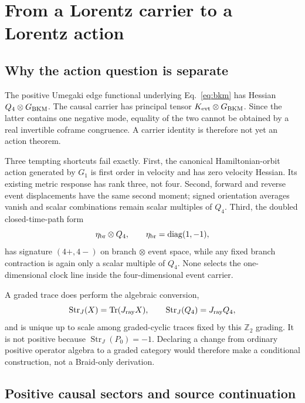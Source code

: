 \documentclass[11pt]{article}
\theoremstyle{definition}
\theoremstyle{remark}
\newcommand{\Tr}{\operatorname{Tr}}
\begin{document}
\section{From a Lorentz carrier to a Lorentz action}

\subsection{Why the action question is separate}

The positive Umegaki edge functional underlying Eq.~\eqref{eq:bkm} has Hessian $Q_4\otimes G_{\rm BKM}$. The causal carrier has principal tensor $K_{\rm evt}\otimes G_{\rm BKM}$. Since the latter contains one negative mode, equality of the two cannot be obtained by a real invertible coframe congruence. A carrier identity is therefore not yet an action theorem.

Three tempting shortcuts fail exactly. First, the canonical Hamiltonian-orbit action generated by $G_1$ is first order in velocity and has zero velocity Hessian. Its existing metric response has rank three, not four. Second, forward and reverse event displacements have the same second moment; signed orientation averages vanish and scalar combinations remain scalar multiples of $Q_4$. Third, the doubled closed-time-path form
\begin{equation}
 \eta_{\rm br}\otimes Q_4,
 \qquad \eta_{\rm br}=\operatorname{diag}(1,-1),
\end{equation}
has signature $(4+,4-)$ on branch $\otimes$ event space, while any fixed branch contraction is again only a scalar multiple of $Q_4$. None selects the one-dimensional clock line inside the four-dimensional event carrier.

A graded trace does perform the algebraic conversion,
\begin{equation}
 \operatorname{Str}_{J}(X)=\Tr(J_{\rm ray}X),
 \qquad \operatorname{Str}_{J}(Q_4)=J_{\rm ray}Q_4,
\end{equation}
and is unique up to scale among graded-cyclic traces fixed by this $\mathbb Z_2$ grading. It is not positive because $\operatorname{Str}_{J}(P_0)=-1$. Declaring a change from ordinary positive operator algebra to a graded category would therefore make a conditional construction, not a Braid-only derivation.

\subsection{Positive causal sectors and source continuation}
\end{document}
